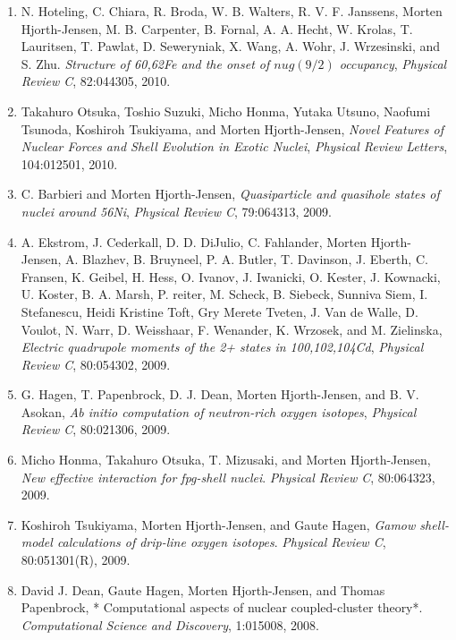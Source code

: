 \documentclass[%
oneside,                 %
final,                   %
10pt]{article}
\begin{document}
\begin{enumerate}
\item N. Hoteling, C. Chiara, R. Broda, W. B. Walters, R. V. F. Janssens, Morten   Hjorth-Jensen, M. B. Carpenter, B. Fornal, A. A. Hecht, W. Krolas,   T. Lauritsen, T. Pawlat, D. Seweryniak, X. Wang, A. Wohr, J. Wrzesinski, and   S. Zhu.  \emph{Structure of 60,62Fe and the onset of $nu g(9/2)$ occupancy},  \emph{Physical Review C}, 82:044305, 2010. 

\item Takahuro Otsuka, Toshio Suzuki, Micho Honma, Yutaka Utsuno, Naofumi Tsunoda,   Koshiroh Tsukiyama, and Morten Hjorth-Jensen,  \emph{Novel Features of Nuclear Forces and Shell Evolution in Exotic Nuclei},  \emph{Physical Review Letters}, 104:012501, 2010. 

\item C. Barbieri and Morten Hjorth-Jensen,  \emph{Quasiparticle and quasihole states of nuclei around 56Ni},  \emph{Physical Review C}, 79:064313, 2009. 

\item A. Ekstrom, J. Cederkall, D. D. DiJulio, C. Fahlander, Morten Hjorth-Jensen,   A. Blazhev, B. Bruyneel, P. A. Butler, T. Davinson, J. Eberth, C. Fransen,   K. Geibel, H. Hess, O. Ivanov, J. Iwanicki, O. Kester, J. Kownacki,   U. Koster, B. A. Marsh, P. reiter, M. Scheck, B. Siebeck, Sunniva Siem,   I. Stefanescu, Heidi Kristine Toft, Gry Merete Tveten, J. Van de Walle,   D. Voulot, N. Warr, D. Weisshaar, F. Wenander, K. Wrzosek, and M. Zielinska,  \emph{Electric quadrupole moments of the 2+ states in  100,102,104Cd},  \emph{Physical Review C}, 80:054302, 2009. 

\item G. Hagen, T. Papenbrock, D. J. Dean, Morten Hjorth-Jensen, and B. V. Asokan,  \emph{Ab initio computation of neutron-rich oxygen isotopes},  \emph{Physical Review C}, 80:021306, 2009. 

\item Micho Honma, Takahuro Otsuka, T. Mizusaki, and Morten Hjorth-Jensen,  \emph{New effective interaction for fpg-shell nuclei}.  \emph{Physical Review C}, 80:064323, 2009. 

\item Koshiroh Tsukiyama, Morten Hjorth-Jensen, and Gaute Hagen,  \emph{Gamow shell-model calculations of drip-line oxygen isotopes}.  \emph{Physical Review C}, 80:051301(R), 2009. 

\item David J. Dean, Gaute Hagen, Morten Hjorth-Jensen, and Thomas Papenbrock,  * Computational aspects of nuclear coupled-cluster theory*.  \emph{Computational Science and Discovery}, 1:015008, 2008. 


\end{enumerate}
\end{document}
